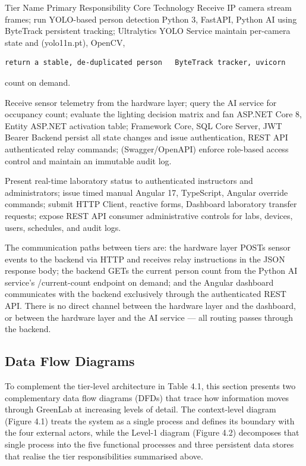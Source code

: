 Tier Name Primary Responsibility Core Technology
Receive IP camera stream frames;
run YOLO-based person detection Python 3, FastAPI,
Python AI using ByteTrack persistent tracking; Ultralytics YOLO
Service maintain per-camera state and (yolo11n.pt), OpenCV,
\begin{lstlisting}
return a stable, de-duplicated person   ByteTrack tracker, uvicorn
\end{lstlisting}

count on demand.

Receive sensor telemetry from the
hardware layer; query the AI service
for occupancy count; evaluate the
lighting decision matrix and fan ASP.NET Core 8, Entity
ASP.NET activation table; Framework Core, SQL
Core Server, JWT Bearer
Backend persist all state changes and issue authentication, REST API
authenticated relay commands; (Swagger/OpenAPI)
enforce role-based access control
and maintain an immutable audit
log.

Present real-time laboratory status
to authenticated instructors and
administrators; issue timed manual
Angular 17, TypeScript,
Angular override commands; submit
HTTP Client, reactive forms,
Dashboard laboratory transfer requests; expose
REST API consumer
administrative controls for labs,
devices, users, schedules, and audit
logs.


The communication paths between tiers are: the hardware layer POSTs sensor events to
the backend via HTTP and receives relay instructions in the JSON response body; the
backend GETs the current person count from the Python AI service's /current-count
endpoint on demand; and the Angular dashboard communicates with the backend
exclusively through the authenticated REST API. There is no direct channel between the
hardware layer and the dashboard, or between the hardware layer and the AI service ---
all routing passes through the backend.




\subsection{Data Flow Diagrams}


To complement the tier-level architecture in Table 4.1, this section presents two
complementary data flow diagrams (DFDs) that trace how information moves through
GreenLab at increasing levels of detail. The context-level diagram (Figure 4.1) treats the
system as a single process and defines its boundary with the four external actors, while
the Level-1 diagram (Figure 4.2) decomposes that single process into the five functional
processes and three persistent data stores that realise the tier responsibilities
summarised above.





